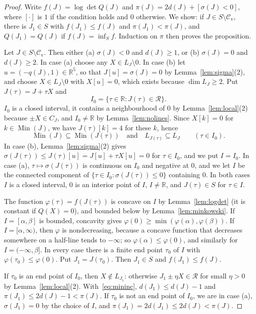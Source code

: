 \documentclass[11pt,reqno]{amsart}
\renewcommand{\_}{\origunderscore\allowbreak}
\numberwithin{equation}{section}
\theoremstyle{plain}
\theoremstyle{definition}
\theoremstyle{remark}
\newcommand{\R}{\mathbb{R}}
\newcommand{\Rk}{\mathcal{R}}
\newcommand{\Min}{\operatorname{Min}}
\newcommand{\cand}{\mathcal{C}_{\mathrm{v}}}
\begin{document}
\begin{proof}
Write $f(J)=\log\det Q(J)$ and $\pi(J)=2d(J)+[\sigma(J)<0]$, where $[\cdot]$ is $1$ if the condition holds and $0$ otherwise. We show: if $J\in S\setminus\cand$, there is $J_1\in S$ with $f(J_1)\le f(J)$ and $\pi(J_1)<\pi(J)$, and $Q(J_1)=Q(J)$ if $f(J)=\inf_Sf$. Induction on $\pi$ then proves the proposition.

Let $J\in S\setminus\cand$. Then either (a) $\sigma(J)<0$ and $d(J)\ge1$, or (b) $\sigma(J)=0$ and $d(J)\ge2$. In case (a) choose any $X\in L_J\setminus0$. In case (b) let $u=(-q(J),1)\in\R^5$, so that $J[u]=\sigma(J)=0$ by Lemma~\ref{lem:sigma}(2), and choose $X\in L_J\setminus0$ with $X[u]=0$, which exists because $\dim L_J\ge2$. Put $J(\tau)=J+\tau X$ and
\[
I_0=\{\tau\in\R:J(\tau)\in\Rk\}.
\]
$I_0$ is a closed interval, it contains a neighbourhood of $0$ by Lemma~\ref{lem:local}(2) because $\pm X\in C_J$, and $I_0\ne\R$ by Lemma~\ref{lem:nolines}. Since $X[k]=0$ for $k\in\Min(J)$, we have $J(\tau)[k]=4$ for these $k$, hence
\begin{equation}\label{eq:mininc}
\Min(J)\subseteq\Min(J(\tau))\quad\text{and}\quad L_{J(\tau)}\subseteq L_J\qquad(\tau\in I_0).
\end{equation}
In case (b), Lemma~\ref{lem:sigma}(2) gives $\sigma(J(\tau))\le J(\tau)[u]=J[u]+\tau X[u]=0$ for $\tau\in I_0$, and we put $I=I_0$. In case (a), $\tau\mapsto\sigma(J(\tau))$ is continuous on $I_0$ and negative at $0$, and we let $I$ be the connected component of $\{\tau\in I_0:\sigma(J(\tau))\le0\}$ containing $0$. In both cases $I$ is a closed interval, $0$ is an interior point of $I$, $I\ne\R$, and $J(\tau)\in S$ for $\tau\in I$.

The function $\varphi(\tau)=f(J(\tau))$ is concave on $I$ by Lemma~\ref{lem:logdet} (it is constant if $Q(X)=0$), and bounded below by Lemma~\ref{lem:minkowski}. If $I=[\alpha,\beta]$ is bounded, concavity gives $\varphi(0)\ge\min(\varphi(\alpha),\varphi(\beta))$. If $I=[\alpha,\infty)$, then $\varphi$ is nondecreasing, because a concave function that decreases somewhere on a half-line tends to $-\infty$; so $\varphi(\alpha)\le\varphi(0)$, and similarly for $I=(-\infty,\beta]$. In every case there is a finite end point $\tau_0$ of $I$ with $\varphi(\tau_0)\le\varphi(0)$. Put $J_1=J(\tau_0)$. Then $J_1\in S$ and $f(J_1)\le f(J)$.

If $\tau_0$ is an end point of $I_0$, then $X\notin L_{J_1}$: otherwise $J_1\pm\eta X\in\Rk$ for small $\eta>0$ by Lemma~\ref{lem:local}(2). With~\eqref{eq:mininc}, $d(J_1)\le d(J)-1$ and $\pi(J_1)\le2d(J)-1<\pi(J)$. If $\tau_0$ is not an end point of $I_0$, we are in case (a), $\sigma(J_1)=0$ by the choice of $I$, and $\pi(J_1)=2d(J_1)\le2d(J)<\pi(J)$.


\end{proof}
\end{document}
